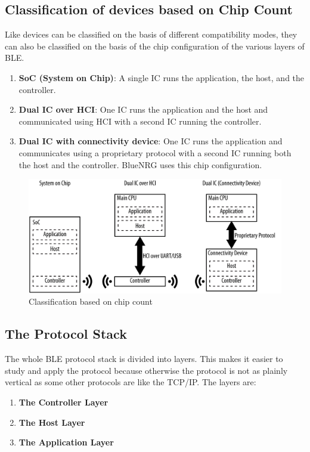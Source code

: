 \subsection{Classification of devices based on Chip Count}
Like devices can be classified on the basis of different compatibility modes, they can also be classified on the basis of the chip configuration of the various layers of BLE.
\begin{enumerate}
	\item \textbf{SoC (System on Chip)}: A single IC runs the application, the host, and the controller.
	\item \textbf{Dual IC over HCI}: One IC runs the application and the host and communicated using HCI with a second IC running the controller.
	\item \textbf{Dual IC with connectivity device}: One IC runs the application and communicates using a proprietary protocol with a second IC running both the host and the controller. BlueNRG uses this chip configuration.
\end{enumerate}
\begin{figure}[ht]
	\centering
	\includegraphics[scale=0.2]{images/chip_count.png}
	\caption{Classification based on chip count}
\end{figure}
\subsection{The Protocol Stack}
The whole BLE protocol stack is divided into layers. This makes it easier to study and apply the protocol because otherwise the protocol is not as plainly vertical as some other protocols are like the TCP/IP. The layers are:
\begin{enumerate}
	\item \textbf{The Controller Layer}
	\item \textbf{The Host Layer}
	\item \textbf{The Application Layer}
\end{enumerate}
